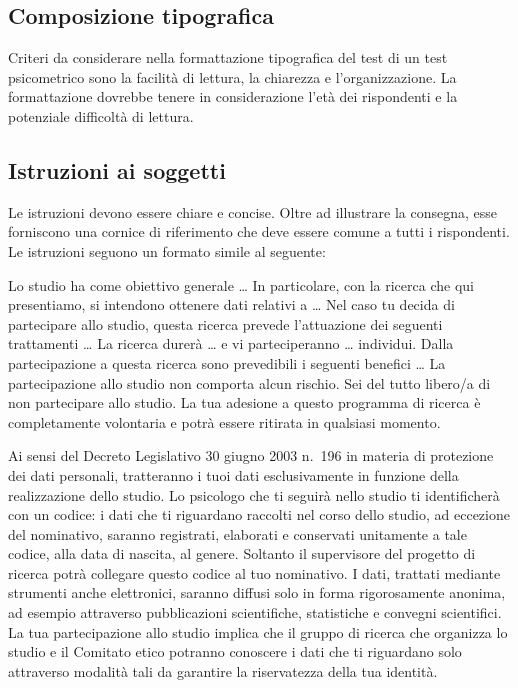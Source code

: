 \documentclass[
  11pt,
]{krantz}
\theoremstyle{definition}
\theoremstyle{definition}
\theoremstyle{definition}
\theoremstyle{definition}
\theoremstyle{remark}
\begin{document}
\hypertarget{composizione-tipografica}{%
\subsection{Composizione tipografica}\label{composizione-tipografica}}

Criteri da considerare nella formattazione tipografica del test di un test psicometrico sono la facilità di lettura, la chiarezza e l'organizzazione. La formattazione dovrebbe tenere in considerazione l'età dei rispondenti e la potenziale difficoltà di lettura.

\hypertarget{istruzioni-ai-soggetti}{%
\subsection{Istruzioni ai soggetti}\label{istruzioni-ai-soggetti}}

Le istruzioni devono essere chiare e concise. Oltre ad illustrare la consegna, esse forniscono una cornice di riferimento che deve essere comune a tutti i rispondenti. Le istruzioni seguono un formato simile al seguente:

Lo studio ha come obiettivo generale \ldots{} In particolare, con la ricerca che qui presentiamo, si intendono ottenere dati relativi a \ldots{} Nel caso tu decida di partecipare allo studio, questa ricerca prevede l'attuazione dei seguenti trattamenti \ldots{} La ricerca durerà \ldots{} e vi parteciperanno \ldots{} individui. Dalla partecipazione a questa ricerca sono prevedibili i seguenti benefici \ldots{} La partecipazione allo studio non comporta alcun rischio. Sei del tutto libero/a di non partecipare allo studio. La tua adesione a questo programma di ricerca è completamente volontaria e potrà essere ritirata in qualsiasi momento.

Ai sensi del Decreto Legislativo 30 giugno 2003 n.~196 in materia di protezione dei dati personali, tratteranno i tuoi dati esclusivamente in funzione della realizzazione dello studio. Lo psicologo che ti seguirà nello studio ti identificherà con un codice: i dati che ti riguardano raccolti nel corso dello studio, ad eccezione del nominativo, saranno registrati, elaborati e conservati unitamente a tale codice, alla data di nascita, al genere. Soltanto il supervisore del progetto di ricerca potrà collegare questo codice al tuo nominativo. I dati, trattati mediante strumenti anche elettronici, saranno diffusi solo in forma rigorosamente anonima, ad esempio attraverso pubblicazioni scientifiche, statistiche e convegni scientifici. La tua partecipazione allo studio implica che il gruppo di ricerca che organizza lo studio e il Comitato etico potranno conoscere i dati che ti riguardano solo attraverso modalità tali da garantire la riservatezza della tua identità.
\end{document}
